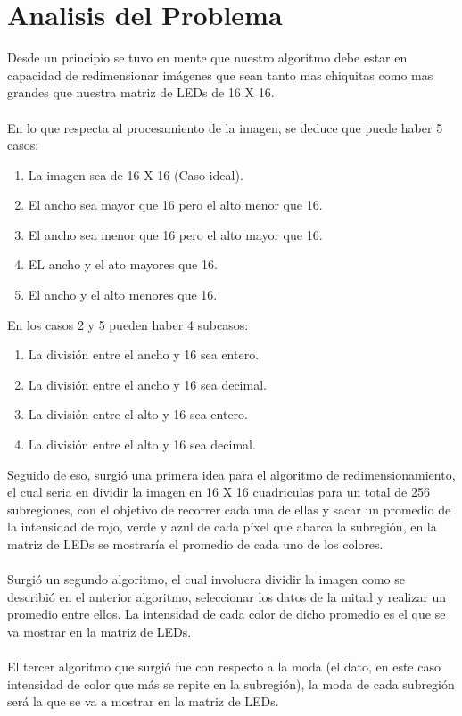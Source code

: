 \documentclass{article}
\begin{document}
\section{Analisis del Problema} \label{Analisis}
Desde un principio se tuvo en mente que nuestro algoritmo debe estar en capacidad de redimensionar imágenes que sean tanto mas chiquitas como mas grandes que nuestra matriz de LEDs de 16 X 16.
\\
\\
En lo que respecta al procesamiento de la imagen, se deduce que puede haber 5 casos:
\begin{enumerate}
    \item La imagen sea de 16 X 16 (Caso ideal).
    \item El ancho sea mayor que 16 pero el alto menor que 16.
    \item El ancho sea menor que 16 pero el alto mayor que 16.
    \item EL ancho y el ato mayores que 16.
    \item El ancho y el alto menores que 16.
\end{enumerate}
En los casos 2 y 5 pueden haber 4 subcasos:
\begin{enumerate}
    \item La división entre el ancho y 16 sea entero.
    \item La división entre el ancho y 16 sea decimal.
    \item La división entre el alto y 16 sea entero.
    \item La división entre el alto y 16 sea decimal.
\end{enumerate}
Seguido de eso, surgió una primera idea para el algoritmo de redimensionamiento, el cual seria en dividir la imagen en 16 X 16 cuadriculas para un total de 256 subregiones, con el objetivo de recorrer cada una de ellas y sacar un promedio de la intensidad de rojo, verde y azul de cada píxel que abarca la subregión, en la matriz de LEDs se mostraría el promedio de cada uno de los colores.
\\
\\
Surgió un segundo algoritmo, el cual involucra dividir la imagen como se describió en el anterior algoritmo, seleccionar los datos de la mitad y realizar un promedio entre ellos. La intensidad de cada color de dicho promedio es el que se va mostrar en la matriz de LEDs.
\\
\\
El tercer algoritmo que surgió fue con respecto a la moda (el dato, en este caso intensidad de color que más se repite en la subregión), la moda de cada subregión será la que se va a mostrar en la matriz de LEDs.
\end{document}
